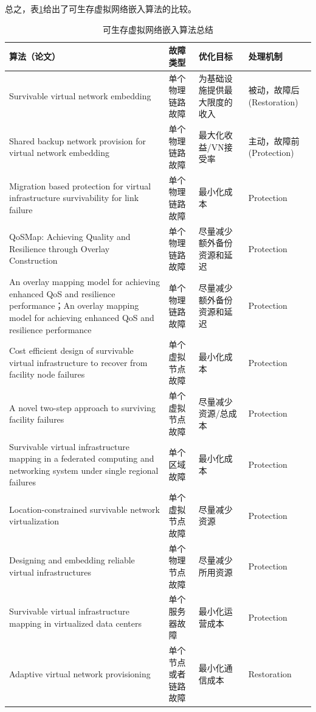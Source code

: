 总之，表\ref{tab:survivableVirtualNetworkEmbedd}给出了可生存虚拟网络嵌入算法的比较。
\begin{table}[h]
\caption{可生存虚拟网络嵌入算法总结}\label{tab:survivableVirtualNetworkEmbedd}
\vspace{0.5em}\centering\wuhao
\begin{tabularx}{48em}{|*{4}{>{\centering\arraybackslash}X|}}
\toprule[1.5pt]
算法（论文）   & 故障类型  & 优化目标 & 处理机制  \\
\midrule[1pt]
Survivable virtual network embedding\cite{rahman2013svne} & 单个物理链路故障 & 为基础设施提供最大限度的收入 & 被动，故障后(Restoration)\\
\hline
Shared backup network provision for virtual network embedding\cite{guo2011shared} & 单个物理链路故障 & 最大化收益/VN接受率& 主动，故障前(Protection)\\
\hline
Migration based protection for virtual infrastructure survivability for link failure\cite{yu2011migration} & 单个物理链路故障 & 最小化成本 & Protection\\
\hline
QoSMap: Achieving Quality and Resilience through Overlay Construction\cite{shamsi2009qosmap} & 单个物理链路故障 & 尽量减少额外备份资源和延迟 & Protection\\
\hline
An overlay mapping model for achieving enhanced QoS and resilience performance\cite{zhang2011overlay}；An overlay mapping model for achieving enhanced QoS and resilience performance\cite{zhang2011overlay} & 单个物理链路故障 & 尽量减少额外备份资源和延迟 & Protection\\
\hline
Cost efficient design of survivable virtual infrastructure to recover from facility node failures\cite{yu2011cost} & 单个虚拟节点故障& 最小化成本 & Protection\\
\hline
A novel two-step approach to surviving facility failures\cite{qiao2011novel} & 单个虚拟节点故障 & 尽量减少资源/总成本 & Protection\\
\hline
Survivable virtual infrastructure mapping in a federated computing and networking system under single regional failures\cite{yu2010survivable} & 单个区域故障 & 最小化成本 & Protection \\
\hline
Location-constrained survivable network virtualization\cite{hu2012location} & 单个虚拟节点故障 & 尽量减少资源 & Protection\\
\hline
Designing and embedding reliable virtual infrastructures\cite{yeow2010designing} & 单个物理节点故障 & 尽量减少所用资源 & Protection\\
\hline
Survivable virtual infrastructure mapping in virtualized data centers\cite{xu2012survivable} & 单个服务器故障 & 最小化运营成本& Protection\\
\hline
Adaptive virtual network provisioning\cite{houidi2010adaptive} & 单个节点或者链路故障 & 最小化通信成本 & Restoration\\
\bottomrule[1.5pt]
\end{tabularx}
\vspace{\baselineskip}
\end{table}

